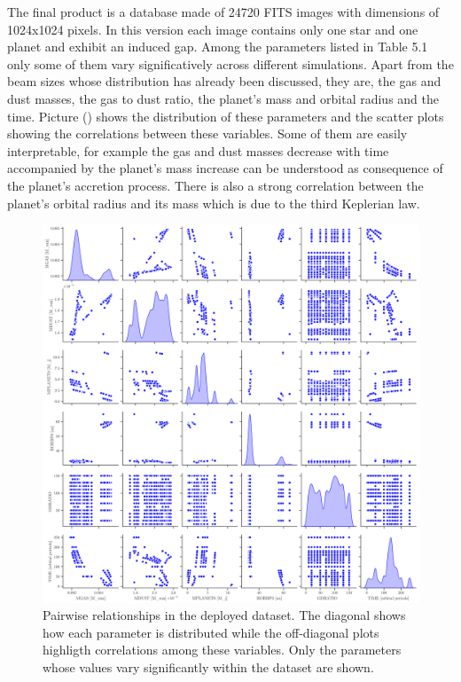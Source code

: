 \documentclass[a4paper,10pt]{report}
\begin{document}
The final product is a database made of 24720 FITS images with dimensions of 1024x1024 pixels. In this
version each image contains only one star and one planet and exhibit an induced gap.
Among the parameters listed in Table 5.1 only some of them vary significatively across different simulations.
Apart from the beam sizes whose distribution has already been discussed, they are, the gas and dust masses, the gas to dust ratio, 
the planet's mass and orbital radius and the time. Picture () shows the distribution of these parameters and the scatter
plots showing the correlations between these variables. Some of them are easily interpretable, for example the
gas and dust masses decrease with time accompanied by the planet's mass increase can be understood as consequence of the planet's accretion
process. There is also a strong correlation between the planet's orbital radius and its mass which is due to the third Keplerian law.

\begin{figure}
    \begin{center}
        \includegraphics[width=\textwidth]{images/pairplot.png}
    \end{center}
    \caption{Pairwise relationships in the deployed dataset. The diagonal shows how each parameter is distributed
    while the off-diagonal plots highligth correlations among these variables. Only the parameters whose values vary
    significantly within the dataset are shown.}
\end{figure}
\end{document}
